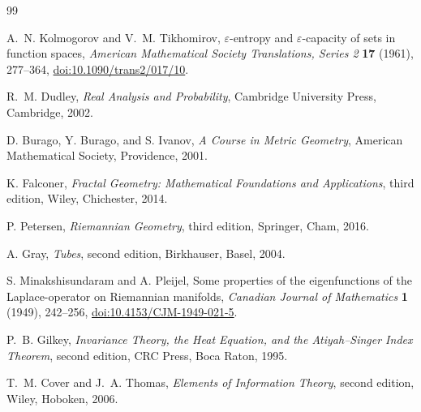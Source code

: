 \documentclass[11pt,a4paper]{article}
\theoremstyle{definition}
\theoremstyle{plain}
\theoremstyle{remark}
\begin{document}
\begin{thebibliography}{99}

A.~N. Kolmogorov and V.~M. Tikhomirov,
\newblock $\varepsilon$-entropy and $\varepsilon$-capacity of sets in
function spaces,
\newblock \emph{American Mathematical Society Translations, Series 2}
\textbf{17} (1961), 277--364,
\newblock \href{https://doi.org/10.1090/trans2/017/10}
{doi:10.1090/trans2/017/10}.

R.~M. Dudley,
\newblock \emph{Real Analysis and Probability},
\newblock Cambridge University Press, Cambridge, 2002.

D. Burago, Y. Burago, and S. Ivanov,
\newblock \emph{A Course in Metric Geometry},
\newblock American Mathematical Society, Providence, 2001.

K. Falconer,
\newblock \emph{Fractal Geometry: Mathematical Foundations and
Applications}, third edition,
\newblock Wiley, Chichester, 2014.

P. Petersen,
\newblock \emph{Riemannian Geometry}, third edition,
\newblock Springer, Cham, 2016.

A. Gray,
\newblock \emph{Tubes}, second edition,
\newblock Birkhauser, Basel, 2004.

S. Minakshisundaram and A. Pleijel,
\newblock Some properties of the eigenfunctions of the Laplace-operator on
Riemannian manifolds,
\newblock \emph{Canadian Journal of Mathematics} \textbf{1} (1949),
242--256,
\newblock \href{https://doi.org/10.4153/CJM-1949-021-5}
{doi:10.4153/CJM-1949-021-5}.

P.~B. Gilkey,
\newblock \emph{Invariance Theory, the Heat Equation, and the
Atiyah--Singer Index Theorem}, second edition,
\newblock CRC Press, Boca Raton, 1995.

T.~M. Cover and J.~A. Thomas,
\newblock \emph{Elements of Information Theory}, second edition,
\newblock Wiley, Hoboken, 2006.

\end{thebibliography}
\end{document}
